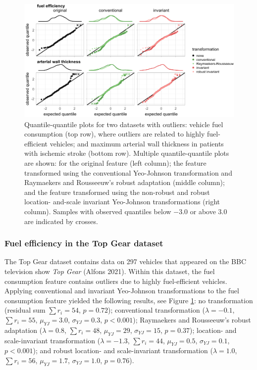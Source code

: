 \documentclass[
  a4paper,
]{article}
\begin{document}
\begin{figure}

{\centering \includegraphics{manuscript_files/figure-latex/experimental-results-outlier-robustness-1} 

}

\caption{Quantile-quantile plots for two datasets with outliers: vehicle fuel consumption (top row), where outliers are related to highly fuel-efficient vehicles; and maximum arterial wall thickness in patients with ischemic stroke (bottom row). Multiple quantile-quantile plots are shown: for the original feature (left column); the feature transformed using the conventional Yeo-Johnson transformation and Raymaekers and Rousseeuw's robust adaptation (middle column); and the feature transformed using the non-robust and robust location- and-scale invariant Yeo-Johnson transformations (right column). Samples with observed quantiles below $-3.0$ or above $3.0$ are indicated by crosses.}\label{fig:experimental-results-outlier-robustness}
\end{figure}

\subsubsection{Fuel efficiency in the Top Gear
dataset}\label{fuel-efficiency-in-the-top-gear-dataset}

The Top Gear dataset contains data on 297 vehicles that appeared on the
BBC television show \emph{Top Gear} (Alfons 2021). Within this dataset,
the fuel consumption feature contains outliers due to highly
fuel-efficient vehicles. Applying conventional and invariant Yeo-Johnson
transformations to the fuel consumption feature yielded the following
results, see Figure \ref{fig:experimental-results-outlier-robustness}:
no transformation (residual sum \(\sum r_i = 54\), \(p=0.72\));
conventional transformation (\(\lambda = -0.1\), \(\sum r_i = 55\),
\(\mu_{YJ} = 3.0\), \(\sigma_{YJ} = 0.3\), \(p < 0.001\)); Raymaekers
and Rousseeuw's robust adaptation (\(\lambda = 0.8\), \(\sum r_i = 48\),
\(\mu_{YJ} = 29\), \(\sigma_{YJ} = 15\), \(p=0.37\)); location- and
scale-invariant transformation (\(\lambda = -1.3\), \(\sum r_i = 44\),
\(\mu_{YJ} = 0.5\), \(\sigma_{YJ} = 0.1\), \(p < 0.001\)); and robust
location- and scale-invariant transformation (\(\lambda = 1.0\),
\(\sum r_i = 56\), \(\mu_{YJ} = 1.7\), \(\sigma_{YJ} = 1.0\),
\(p=0.76\)).
\end{document}
